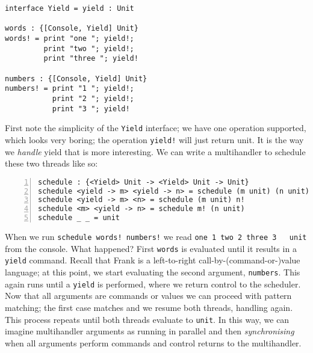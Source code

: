 \documentclass[msc,deptreport,cs]{infthesis} %
\newcommand{\code}[1]{\lstinline{#1}}
\begin{document}
\begin{lstlisting}
interface Yield = yield : Unit

words : {[Console, Yield] Unit}
words! = print "one "; yield!;
         print "two "; yield!;
         print "three "; yield!

numbers : {[Console, Yield] Unit}
numbers! = print "1 "; yield!;
           print "2 "; yield!;
           print "3 "; yield!
\end{lstlisting}

First note the simplicity of the \code{Yield} interface; we have one operation
supported, which looks very boring; the operation \code{yield!} will just return
unit. It is the way we \emph{handle} yield that is more interesting. We can write a multihandler to schedule these two threads like so:

\begin{lstlisting}[numbers=left]
schedule : {<Yield> Unit -> <Yield> Unit -> Unit}
schedule <yield -> m> <yield -> n> = schedule (m unit) (n unit)
schedule <yield -> m> <n> = schedule (m unit) n!
schedule <m> <yield -> n> = schedule m! (n unit)
schedule _ _ = unit
\end{lstlisting}

When we run \code{schedule words! numbers!} we read \code{one 1 two 2 three 3
  unit} from the console. What happened? First \code{words} is evaluated until
it results in a \code{yield} command. Recall that Frank is a left-to-right
call-by-(command-or-)value language; at this point, we start evaluating the
second argument, \code{numbers}. This again runs until a \code{yield} is
performed, where we return control to the scheduler. Now that all arguments are
commands or values we can proceed with pattern matching; the first case matches
and we resume both threads, handling again. This process repeats until both
threads evaluate to \code{unit}. In this way, we can imagine multihandler
arguments as running in parallel and then \emph{synchronising} when all
arguments perform commands and control returns to the multihandler.

\end{document}
